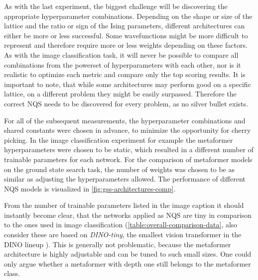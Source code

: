 As with the last experiment, the biggest challenge will be discovering the appropriate hyperparameter combinations.
Depending on the shape or size of the lattice and the ratio or sign of the Ising parameters, different architectures can either be more or less successful.
Some wavefunctions might be more difficult to represent and therefore require more or less weights depending on these factors.
As with the image classification task, it will never be possible to compare all combinations from the powerset of hyperparameters with each other, nor is it realistic to optimize each metric and compare only the top scoring results.
It is important to note, that while some architectures may perform good on a specific lattice, on a different problem they might be easily surpassed. 
Therefore the correct NQS needs to be discovered for every problem, as no \glqq silver bullet\grqq{} exists.

For all of the subsequent measurements, the hyperparameter combinations and shared constants were chosen in advance, to minimize the opportunity for cherry picking.
In the image classification experiment for example the metaformer hyperparameters were chosen to be static, which resulted in a different number of trainable parameters for each network.
For the comparison of metaformer models on the ground state search task, the number of weights was chosen to be as similar as adjusting the hyperparameters allowed. 
The performance of different NQS models is visualized in \autoref{fig:gss-architectures-comp}.

From the number of trainable parameters listed in the image caption it should instantly become clear, that the networks applied as NQS are tiny in comparison to the ones used in image classification (\autoref{table:overall-comparison-data}, also consider these are based on \emph{DINO-tiny}, the smallest vision transformer in the DINO lineup \cite{dinoGithub}).
This is generally not problematic, because the metaformer architecture is highly adjustable and can be tuned to such small sizes. One could only argue whether a metaformer with depth one still belongs to the metaformer class.


